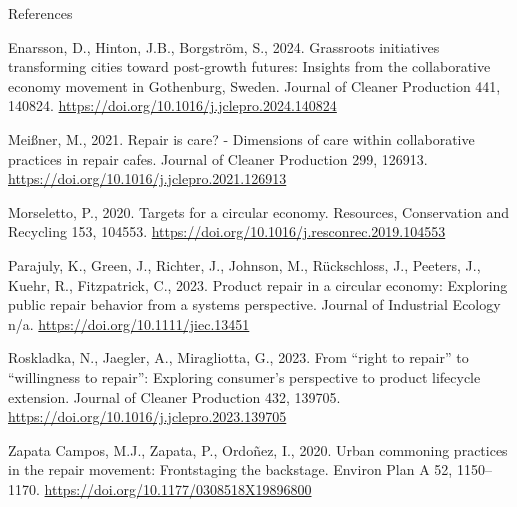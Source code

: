 \documentclass[
  ignorenonframetext,
  aspectratio=169,
  c]{beamer}
\newlength{\cslhangindent}
\newenvironment{CSLReferences}[2] %
 {\begin{list}{}{%
  \setlength{\itemindent}{0pt}
  \setlength{\leftmargin}{0pt}
  \setlength{\parsep}{0pt}
  \ifodd #1
   \setlength{\leftmargin}{\cslhangindent}
   \setlength{\itemindent}{-1\cslhangindent}
  \fi
  \setlength{\itemsep}{#2\baselineskip}}}
 {\end{list}}
\begin{document}
\begin{frame}{References}
\label{references}
\tiny

\label{refs}
\begin{CSLReferences}{1}{0}
Enarsson, D., Hinton, J.B., Borgström, S., 2024. Grassroots initiatives
transforming cities toward post-growth futures: {Insights} from the
collaborative economy movement in {Gothenburg}, {Sweden}. Journal of
Cleaner Production 441, 140824.
\url{https://doi.org/10.1016/j.jclepro.2024.140824}

Meißner, M., 2021. Repair is care? - {Dimensions} of care within
collaborative practices in repair cafes. Journal of Cleaner Production
299, 126913. \url{https://doi.org/10.1016/j.jclepro.2021.126913}

Morseletto, P., 2020. Targets for a circular economy. Resources,
Conservation and Recycling 153, 104553.
\url{https://doi.org/10.1016/j.resconrec.2019.104553}

Parajuly, K., Green, J., Richter, J., Johnson, M., Rückschloss, J.,
Peeters, J., Kuehr, R., Fitzpatrick, C., 2023. Product repair in a
circular economy: {Exploring} public repair behavior from a systems
perspective. Journal of Industrial Ecology n/a.
\url{https://doi.org/10.1111/jiec.13451}

Roskladka, N., Jaegler, A., Miragliotta, G., 2023. From {``right to
repair''} to {``willingness to repair''}: {Exploring} consumer's
perspective to product lifecycle extension. Journal of Cleaner
Production 432, 139705.
\url{https://doi.org/10.1016/j.jclepro.2023.139705}

Zapata Campos, M.J., Zapata, P., Ordoñez, I., 2020. Urban commoning
practices in the repair movement: {Frontstaging} the backstage. Environ
Plan A 52, 1150--1170. \url{https://doi.org/10.1177/0308518X19896800}

\end{CSLReferences}
\end{frame}
\end{document}
